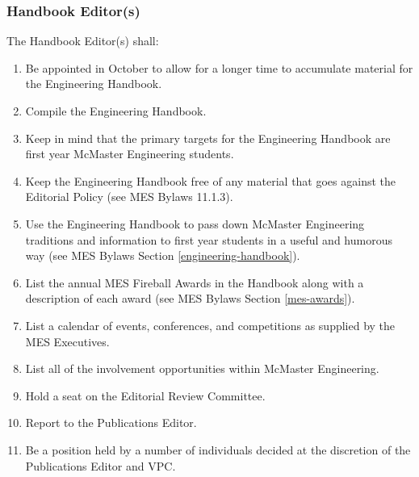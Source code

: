 
\subsubsection{Handbook Editor(s)}
\label{handbook-editors}
The Handbook Editor(s) shall:

\begin{enumerate}
 \item
  Be appointed in October to allow for a longer time to accumulate material for the Engineering Handbook.
 \item
  Compile the Engineering Handbook.
 \item
  Keep in mind that the primary targets for the Engineering Handbook are first year McMaster Engineering students.
 \item
  Keep the Engineering Handbook free of any material that goes against the Editorial Policy (see MES Bylaws 11.1.3).
 \item
  Use the Engineering Handbook to pass down McMaster Engineering traditions and information to first year students in a useful and humorous way (see MES Bylaws Section \ref{engineering-handbook}).
 \item
  List the annual MES Fireball Awards in the Handbook along with a description of each award (see MES Bylaws Section \ref{mes-awards}).
 \item
  List a calendar of events, conferences, and competitions as supplied by the MES Executives.
 \item
  List all of the involvement opportunities within McMaster Engineering.
 \item
  Hold a seat on the Editorial Review Committee. 
 \item    
  Report to the Publications Editor.
 \item
  Be a position held by a number of individuals decided at the discretion of the Publications Editor and VPC.

\end{enumerate}